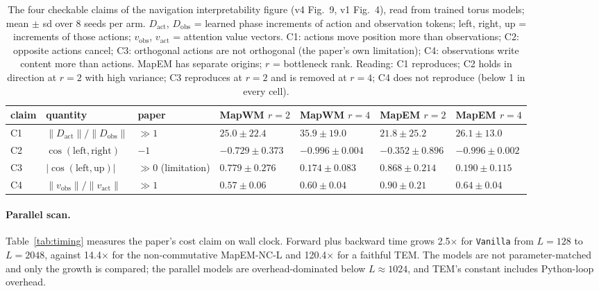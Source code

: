 \documentclass[10pt]{article}
\newcommand{\arm}[1]{\texttt{#1}}
\begin{document}
\begin{table}[t]
\centering
\small
\captionsetup{font=footnotesize,skip=4pt}
\caption{The four checkable claims of the navigation interpretability figure (v4 Fig.~9, v1 Fig.~4), read from trained torus models; mean $\pm$ sd over 8 seeds per arm. $D_{\mathrm{act}}$, $D_{\mathrm{obs}}$ = learned phase increments of action and observation tokens; left, right, up = increments of those actions; $v_{\mathrm{obs}}$, $v_{\mathrm{act}}$ = attention value vectors. C1: actions move position more than observations; C2: opposite actions cancel; C3: orthogonal actions are not orthogonal (the paper's own limitation); C4: observations write content more than actions. MapEM has separate origins; $r$ = bottleneck rank. Reading: C1 reproduces; C2 holds in direction at $r=2$ with high variance; C3 reproduces at $r=2$ and is removed at $r=4$; C4 does not reproduce (below 1 in every cell).}
\label{tab:fig4}
\begin{tabular}{@{}lllllll@{}}
\toprule
claim & quantity & paper & MapWM $r=2$ & MapWM $r=4$ & MapEM $r=2$ & MapEM $r=4$ \\
\midrule
C1 & $\|D_{\mathrm{act}}\|/\|D_{\mathrm{obs}}\|$ & $\gg1$ & $25.0\pm22.4$ & $35.9\pm19.0$ & $21.8\pm25.2$ & $26.1\pm13.0$ \\
C2 & $\cos(\text{left},\text{right})$ & $-1$ & $-0.729\pm0.373$ & $-0.996\pm0.004$ & $-0.352\pm0.896$ & $-0.996\pm0.002$ \\
C3 & $|\cos(\text{left},\text{up})|$ & $\gg0$ (limitation) & $0.779\pm0.276$ & $0.174\pm0.083$ & $0.868\pm0.214$ & $0.190\pm0.115$ \\
C4 & $\|v_{\mathrm{obs}}\|/\|v_{\mathrm{act}}\|$ & $\gg1$ & $0.57\pm0.06$ & $0.60\pm0.04$ & $0.90\pm0.21$ & $0.64\pm0.04$ \\
\bottomrule
\end{tabular}
\end{table}

\paragraph{Parallel scan.} Table~\ref{tab:timing} measures the paper's cost claim on wall clock.
Forward plus backward time grows 2.5$\times$ for \arm{Vanilla} from $L=128$ to $L=2048$, against
14.4$\times$ for the non-commutative MapEM-NC-L and 120.4$\times$ for a faithful TEM. The models are not
parameter-matched and only the growth is compared; the parallel models are overhead-dominated below
$L\approx1024$, and TEM's constant includes Python-loop overhead. %
\end{document}
